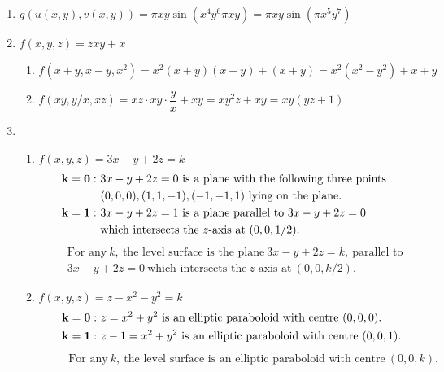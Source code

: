 \documentclass[12pt]{amsart}
\begin{document}
\begin{enumerate}
	\item $g(u(x,y),v(x,y))=\pi xy\sin(x^4y^6\pi xy)=\pi xy\sin(\pi x^5y^7)$ \\
					
	\item $f(x,y,z)=zxy+x$
		\begin{enumerate}
			\item $f(x+y,x-y,x^2)=x^2(x+y)(x-y)+(x+y)=x^2(x^2-y^2)+x+y$				
			\item $f(xy,y/x, xz)=xz\cdot xy\cdot \dfrac{y}{x}+xy=xy^2z+xy=xy(yz+1)$ \\
		\end{enumerate}
		
	\item
		\begin{enumerate}
			\item $f(x,y,z)=3x-y+2z=k$
				\begin{align*}
					\bold{k=0:} \ &3x-y+2z=0 \ \text{is a plane with the following three points} \\
					&(0,0,0), (1,1,-1), (-1,-1,1) \ \text{lying on the plane.} \\
					\bold{k=1:} \ &3x-y+2z=1 \ \text{is a plane parallel to} \ 3x-y+2z=0 \\
					&\text{which intersects the} \ z\text{-axis at} \ (0,0,1/2).
				\end{align*}	
				\begin{align*}
					&\ \ \ \ \ \text{For any} \ k, \ \text{the level surface is the plane} \ 3x-y+2z=k, \ \text{parallel to} \\
					&\ \ \ \ \ 3x-y+2z=0 \ \text{which intersects the} \ z\text{-axis at} \ (0,0,k/2).
				\end{align*}					
			\item $f(x,y,z)=z-x^2-y^2=k$
				\begin{align*}
					&\ \ \ \ \bold{k=0:} \ z=x^2+y^2 \ \text{is an elliptic paraboloid with centre} \ (0,0,0). \\
					&\ \ \ \ \bold{k=1:} \ z-1=x^2+y^2 \ \text{is an elliptic paraboloid with centre} \ (0,0,1).
				\end{align*}	
				\begin{align*}
					\ \ \ \ \ \ \ \ \ \ \text{For any} \ k, \ \text{the level surface is an elliptic paraboloid with centre} \ (0,0,k).
				\end{align*}			
		\end{enumerate}
		
\end{enumerate}
\end{document}
